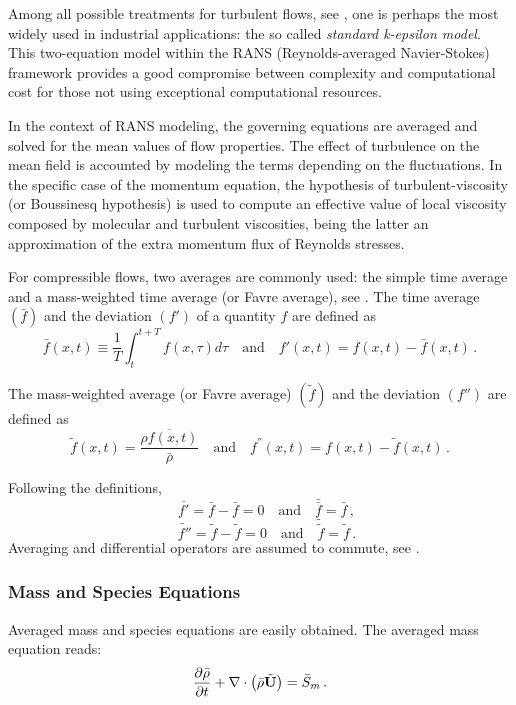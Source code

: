 Among all possible treatments for turbulent flows, see
\cite{pope2000turbulent}, one is perhaps the most widely used in industrial
applications: the so called \textit{standard k-epsilon model}. This two-equation
model within the RANS (Reynolds-averaged Navier-Stokes) framework provides a good
compromise between complexity and computational cost for those not using
exceptional computational resources. 

In the context of RANS modeling, the governing equations are averaged and solved
for the mean values of flow properties. The effect of turbulence on the mean
field is accounted by modeling the terms depending on the fluctuations. In the
specific case of the momentum equation, the hypothesis of turbulent-viscosity
(or Boussinesq hypothesis) is used to compute an effective value of local
viscosity composed by molecular and turbulent viscosities, being the
latter an approximation of the extra momentum flux of Reynolds stresses.

For compressible flows, two averages are commonly used: the simple time average
and a mass-weighted time average (or Favre average), see \cite{favre1969statistical}.
The time average $(\bar{f})$ and the deviation $(f')$  of a quantity $f$ are
defined as
\begin{equation}
 \bar{f}(x,t) \equiv \frac{1}{T}\int_{t}^{t+T} f(x,\tau) d\tau \quad \text{and}
\quad f'(x,t)= f(x,t)-\bar{f}(x,t) \, .
\end{equation}

The mass-weighted average (or Favre average) $(\tilde{f})$ and the deviation
$(f'')$ are defined as
\begin{equation}
 \tilde{f}(x,t) = \frac{\overline{\rho f(x,t)}}{\bar{\rho}} \quad \text{and}
\quad f^{''}(x,t) = f(x,t) - \tilde{f}(x,t) \, .
\end{equation}

Following the definitions,
\begin{equation}
 \quad \overline{f'}=\bar{f}-\bar{f}=0 \quad \text{and} \quad \bar{\bar{f}}=
\bar{f}\, ,
\end{equation}
\begin{equation}
 \quad \tilde{f''}=\tilde{f}-\tilde{f}=0 \quad \text{and} \quad \tilde{\tilde{f}}=
\tilde{f}\, .
\end{equation}
Averaging and differential operators are assumed to commute, see \cite{pope2000turbulent}. 

\subsubsection{Mass and Species Equations}
Averaged mass and species equations are easily obtained. The
averaged mass equation reads:
\begin{equation}\label{av: mass}
  \frac{\partial \bar{\rho}}{\partial t} + \nabla \cdot \left( \bar{\rho}
\tilde{\bv{U}} \right) =  \bar{S}_m \, .
\end{equation}

